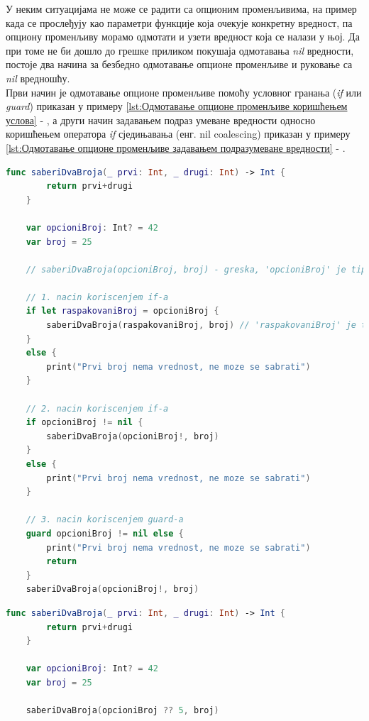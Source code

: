 \documentclass[12pt,oneside]{memoir}
\begin{document}
\indent У неким ситуацијама не може се радити са опционим променљивима, на пример када се прослеђују као параметри функције која очекује конкретну вредност, па опциону променљиву морамо одмотати и узети вредност која се налази у њој. Да при томе не би дошло до грешке приликом покушаја одмотавања \textit{nil} вредности, постоје два начина за безбедно одмотавање опционе променљиве и руковање са \textit{nil} вредношћу.
\\
\indent Први начин је одмотавање опционе променљиве помоћу условног гранања (\textit{if} или \textit{guard}) приказан у примеру \ref{lst:Одмотавање опционе променљиве коришћењем услова} - , а други начин задавањем подраз умеване вредности односно коришћењем оператора \textit{if} сједињавања (енг. nil coalescing) приказан у примеру \ref{lst:Одмотавање опционе променљиве задавањем подразумеване вредности} - .

\begin{lstlisting}[caption=\textit{{Одмотавање опционе променљиве коришћењем услова}}, label={lst:Одмотавање опционе променљиве коришћењем услова}, language=Swift, frame=single]
    func saberiDvaBroja(_ prvi: Int, _ drugi: Int) -> Int {
        return prvi+drugi
    }
    
    var opcioniBroj: Int? = 42
    var broj = 25
    
    // saberiDvaBroja(opcioniBroj, broj) - greska, 'opcioniBroj' je tipa 'Int?' dok funkcija ocekuje parametar tipa 'Int'
    
    // 1. nacin koriscenjem if-a
    if let raspakovaniBroj = opcioniBroj {
        saberiDvaBroja(raspakovaniBroj, broj) // 'raspakovaniBroj' je tipa 'Int'
    }
    else {
        print("Prvi broj nema vrednost, ne moze se sabrati")
    }
    
    // 2. nacin koriscenjem if-a
    if opcioniBroj != nil {
        saberiDvaBroja(opcioniBroj!, broj)
    }
    else {
        print("Prvi broj nema vrednost, ne moze se sabrati")
    }
    
    // 3. nacin koriscenjem guard-a
    guard opcioniBroj != nil else {
        print("Prvi broj nema vrednost, ne moze se sabrati")
        return
    }
    saberiDvaBroja(opcioniBroj!, broj)
\end{lstlisting}

\begin{lstlisting}[caption=\textit{{Одмотавање опционе променљиве задавањем подразумеване вредности}}, label={lst:Одмотавање опционе променљиве задавањем подразумеване вредности}, language=Swift, frame=single]
    func saberiDvaBroja(_ prvi: Int, _ drugi: Int) -> Int {
        return prvi+drugi
    }
    
    var opcioniBroj: Int? = 42
    var broj = 25
    
    saberiDvaBroja(opcioniBroj ?? 5, broj)
\end{lstlisting}
\end{document}
